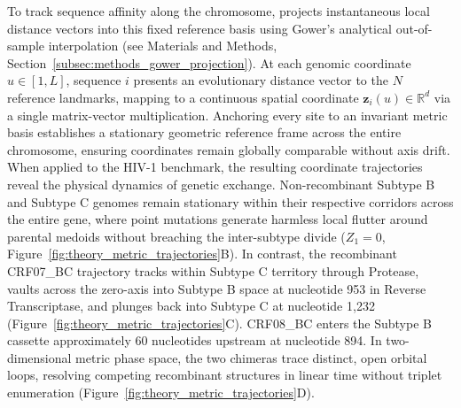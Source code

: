 To track sequence affinity along the chromosome, \RhizAeon projects instantaneous local distance vectors into this fixed reference basis using Gower's analytical out-of-sample interpolation \citep{gower1968adding} (see Materials and Methods, Section~\ref{subsec:methods_gower_projection}).
At each genomic coordinate $u \in [1, L]$, sequence $i$ presents an evolutionary distance vector to the $N$ reference landmarks, mapping to a continuous spatial coordinate $\mathbf{z}_i(u) \in \mathbb{R}^d$ via a single matrix-vector multiplication.
Anchoring every site to an invariant metric basis establishes a stationary geometric reference frame across the entire chromosome, ensuring coordinates remain globally comparable without axis drift.
When applied to the HIV-1 benchmark, the resulting coordinate trajectories reveal the physical dynamics of genetic exchange.
Non-recombinant Subtype B and Subtype C genomes remain stationary within their respective corridors across the entire gene, where point mutations generate harmless local flutter around parental medoids without breaching the inter-subtype divide ($Z_1 = 0$, Figure~\ref{fig:theory_metric_trajectories}B).
In contrast, the recombinant CRF07\_BC trajectory tracks within Subtype C territory through Protease, vaults across the zero-axis into Subtype B space at nucleotide 953 in Reverse Transcriptase, and plunges back into Subtype C at nucleotide 1,232 (Figure~\ref{fig:theory_metric_trajectories}C).
CRF08\_BC enters the Subtype B cassette approximately 60 nucleotides upstream at nucleotide 894.
In two-dimensional metric phase space, the two chimeras trace distinct, open orbital loops, resolving competing recombinant structures in linear time without triplet enumeration (Figure~\ref{fig:theory_metric_trajectories}D).

